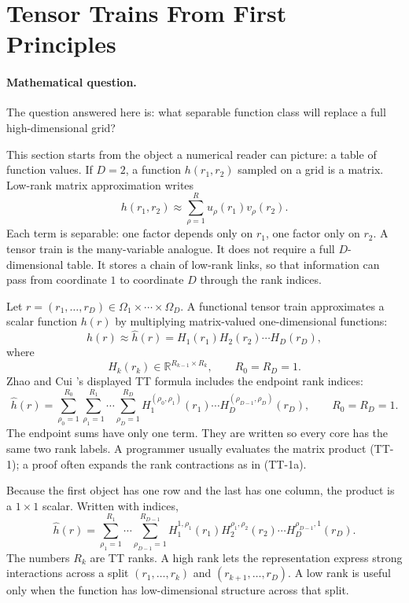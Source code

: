\documentclass[11pt]{article}
\numberwithin{equation}{section}
\newcommand{\R}{\mathbb R}
\begin{document}
\section{Tensor Trains From First Principles}

\paragraph{Mathematical question.}
The question answered here is: what separable function class will replace a
full high-dimensional grid?

This section starts from the object a numerical reader can picture: a table of
function values.  If \(D=2\), a function \(h(r_1,r_2)\) sampled on a grid is a
matrix.  Low-rank matrix approximation writes
\[
    h(r_1,r_2)\approx \sum_{\rho=1}^{R} u_\rho(r_1)v_\rho(r_2).
\]
Each term is separable: one factor depends only on \(r_1\), one factor only on
\(r_2\).  A tensor train is the many-variable analogue.  It does not require a
full \(D\)-dimensional table.  It stores a chain of low-rank links, so that
information can pass from coordinate \(1\) to coordinate \(D\) through the rank
indices.

Let \(r=(r_1,\ldots,r_D)\in\Omega_1\times\cdots\times\Omega_D\).  A functional
tensor train approximates a scalar function \(h(r)\) by multiplying
matrix-valued one-dimensional functions:
\begin{equation}
    h(r)
    \approx
    \widehat h(r)
    =
    H_1(r_1)H_2(r_2)\cdots H_D(r_D),
    \label{eq:p24-tt-1}
\end{equation}
where
\[
    H_k(r_k)\in \R^{R_{k-1}\times R_k},\qquad R_0=R_D=1.
\]
Zhao and Cui \cite{zhao2024ttsequential}'s displayed TT formula includes the endpoint rank indices:
\begin{equation}
    \widehat h(r)
    =
    \sum_{\rho_0=1}^{R_0}\sum_{\rho_1=1}^{R_1}\cdots
    \sum_{\rho_D=1}^{R_D}
    H_1^{(\rho_0,\rho_1)}(r_1)\cdots
    H_D^{(\rho_{D-1},\rho_D)}(r_D),
    \qquad R_0=R_D=1.
    \label{eq:p24-tt-1a}
\end{equation}
The endpoint sums have only one term.  They are written so every core has the
same two rank labels.  A programmer usually evaluates the matrix product
(TT-1); a proof often expands the rank contractions as in (TT-1a).

Because the first object has one row and the last has one column, the product is
a \(1\times 1\) scalar.  Written with indices,
\begin{equation}
    \widehat h(r)
    =
    \sum_{\rho_1=1}^{R_1}\cdots
    \sum_{\rho_{D-1}=1}^{R_{D-1}}
    H_1^{1,\rho_1}(r_1)
    H_2^{\rho_1,\rho_2}(r_2)\cdots
    H_D^{\rho_{D-1},1}(r_D).
    \label{eq:p24-tt-2}
\end{equation}
The numbers \(R_k\) are TT ranks.  A high rank lets the representation express
strong interactions across a split \((r_1,\ldots,r_k)\) and
\((r_{k+1},\ldots,r_D)\).  A low rank is useful only when the function has
low-dimensional structure across that split.
\end{document}
